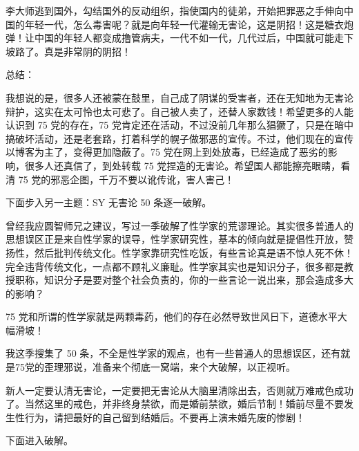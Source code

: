 \documentclass{ctexart}
\begin{document}
李大师逃到国外，勾结国外的反动组织，指使国内的徒弟，开始把罪恶之手伸向中国的年轻一代，怎么毒害呢？就是向年轻一代灌输无害论，这是阴招！这是糖衣炮弹！让中国的年轻人都变成撸管病夫，一代不如一代，几代过后，中国就可能走下坡路了。真是非常阴的阴招！

总结：

我想说的是，很多人还被蒙在鼓里，自己成了阴谋的受害者，还在无知地为无害论辩护，这实在太可怜也太可悲了。自己被人卖了，还替人家数钱！希望更多的人能认识到 75 党的存在，75 党肯定还在活动，不过没前几年那么猖獗了，只是在暗中搞破坏活动，还是老套路，打着科学的幌子做邪恶的宣传。不过，他们现在的宣传以博客为主了，变得更加隐蔽了。75 党在网上到处放毒，已经造成了恶劣的影响，很多人还真信了，到处转载 75 党捏造的无害论。希望国人都能擦亮眼睛，看清 75 党的邪恶企图，千万不要以讹传讹，害人害己！


下面步入另一主题：SY 无害论 50 条逐一破解。

曾经我应圆智师兄之建议，写过一季破解了性学家的荒谬理论。其实很多普通人的思想误区正是来自性学家的误导，性学家研究性，基本的倾向就是提倡性开放，赞扬性，然后批判传统文化。性学家靠研究性吃饭，有些言论真是语不惊人死不休！完全违背传统文化，一点都不顾礼义廉耻。性学家其实也是知识分子，很多都是教授职称，知识分子是要对整个社会负责的，你的一些言论一说出来，那会造成多大的影响？

75 党和所谓的性学家就是两颗毒药，他们的存在必然导致世风日下，道德水平大幅滑坡！

我这季搜集了 50 条，不全是性学家的观点，也有一些普通人的思想误区，还有就是75党的歪理邪说，准备来个彻底一窝端，来个大破解，以正视听。

新人一定要认清无害论，一定要把无害论从大脑里清除出去，否则就万难戒色成功了。当然这里的戒色，并非终身禁欲，而是婚前禁欲，婚后节制！婚前尽量不要发生性行为，请把最好的自己留到结婚后。不要再上演未婚先废的惨剧！

下面进入破解。
\end{document}
